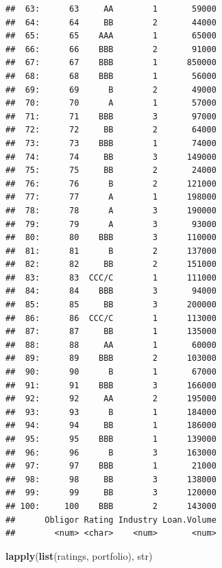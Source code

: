 \documentclass[
  11pt,
]{article}
\newenvironment{Shaded}{\begin{snugshade}}{\end{snugshade}}
\newcommand{\FunctionTok}[1]{\textcolor[rgb]{0.13,0.29,0.53}{\textbf{#1}}}
\newcommand{\NormalTok}[1]{#1}
\begin{document}
\begin{verbatim}
##  63:      63     AA        1       59000
##  64:      64     BB        2       44000
##  65:      65    AAA        1       65000
##  66:      66    BBB        2       91000
##  67:      67    BBB        1      850000
##  68:      68    BBB        1       56000
##  69:      69      B        2       49000
##  70:      70      A        1       57000
##  71:      71    BBB        3       97000
##  72:      72     BB        2       64000
##  73:      73    BBB        1       74000
##  74:      74     BB        3      149000
##  75:      75     BB        2       24000
##  76:      76      B        2      121000
##  77:      77      A        1      198000
##  78:      78      A        3      190000
##  79:      79      A        3       93000
##  80:      80    BBB        3      110000
##  81:      81      B        2      137000
##  82:      82     BB        2      151000
##  83:      83  CCC/C        1      111000
##  84:      84    BBB        3       94000
##  85:      85     BB        3      200000
##  86:      86  CCC/C        1      113000
##  87:      87     BB        1      135000
##  88:      88     AA        1       60000
##  89:      89    BBB        2      103000
##  90:      90      B        1       67000
##  91:      91    BBB        3      166000
##  92:      92     AA        2      195000
##  93:      93      B        1      184000
##  94:      94     BB        1      186000
##  95:      95    BBB        1      139000
##  96:      96      B        3      163000
##  97:      97    BBB        1       21000
##  98:      98     BB        3      138000
##  99:      99     BB        3      120000
## 100:     100    BBB        2      143000
##      Obligor Rating Industry Loan.Volume
##        <num> <char>    <num>       <num>
\end{verbatim}

\begin{Shaded}
\begin{Highlighting}[]
\FunctionTok{lapply}\NormalTok{(}\FunctionTok{list}\NormalTok{(ratings, portfolio), str)}
\end{Highlighting}
\end{Shaded}
\end{document}
